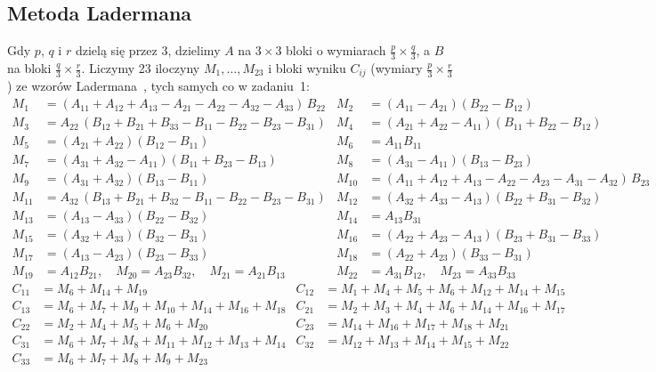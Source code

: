 \subsection{Metoda Ladermana}
Gdy $p$, $q$ i $r$ dzielą się przez 3, dzielimy $A$ na $3\times3$ bloki o wymiarach $\frac p3\times\frac q3$, a $B$ na
bloki $\frac q3\times\frac r3$. Liczymy 23 iloczyny $M_1,\dots,M_{23}$ i bloki wyniku $C_{ij}$ (wymiary
$\frac p3\times\frac r3$) ze wzorów Ladermana~\cite{laderman}, tych samych co w zadaniu~1:
{\small
\begin{equation}\label{eq:laderman-m}
\begin{aligned}
M_{1}  &= (A_{11}{+}A_{12}{+}A_{13}{-}A_{21}{-}A_{22}{-}A_{32}{-}A_{33})\,B_{22} &
M_{2}  &= (A_{11}{-}A_{21})(B_{22}{-}B_{12}) \\
M_{3}  &= A_{22}\,(B_{12}{+}B_{21}{+}B_{33}{-}B_{11}{-}B_{22}{-}B_{23}{-}B_{31}) &
M_{4}  &= (A_{21}{+}A_{22}{-}A_{11})(B_{11}{+}B_{22}{-}B_{12}) \\
M_{5}  &= (A_{21}{+}A_{22})(B_{12}{-}B_{11}) &
M_{6}  &= A_{11}B_{11} \\
M_{7}  &= (A_{31}{+}A_{32}{-}A_{11})(B_{11}{+}B_{23}{-}B_{13}) &
M_{8}  &= (A_{31}{-}A_{11})(B_{13}{-}B_{23}) \\
M_{9}  &= (A_{31}{+}A_{32})(B_{13}{-}B_{11}) &
M_{10} &= (A_{11}{+}A_{12}{+}A_{13}{-}A_{22}{-}A_{23}{-}A_{31}{-}A_{32})\,B_{23} \\
M_{11} &= A_{32}\,(B_{13}{+}B_{21}{+}B_{32}{-}B_{11}{-}B_{22}{-}B_{23}{-}B_{31}) &
M_{12} &= (A_{32}{+}A_{33}{-}A_{13})(B_{22}{+}B_{31}{-}B_{32}) \\
M_{13} &= (A_{13}{-}A_{33})(B_{22}{-}B_{32}) &
M_{14} &= A_{13}B_{31} \\
M_{15} &= (A_{32}{+}A_{33})(B_{32}{-}B_{31}) &
M_{16} &= (A_{22}{+}A_{23}{-}A_{13})(B_{23}{+}B_{31}{-}B_{33}) \\
M_{17} &= (A_{13}{-}A_{23})(B_{23}{-}B_{33}) &
M_{18} &= (A_{22}{+}A_{23})(B_{33}{-}B_{31}) \\
M_{19} &= A_{12}B_{21},\quad M_{20} = A_{23}B_{32},\quad M_{21} = A_{21}B_{13} &
M_{22} &= A_{31}B_{12},\quad M_{23} = A_{33}B_{33}
\end{aligned}
\end{equation}
\begin{equation}\label{eq:laderman-c}
\begin{aligned}
C_{11} &= M_6{+}M_{14}{+}M_{19} &
C_{12} &= M_1{+}M_4{+}M_5{+}M_6{+}M_{12}{+}M_{14}{+}M_{15} \\
C_{13} &= M_6{+}M_7{+}M_9{+}M_{10}{+}M_{14}{+}M_{16}{+}M_{18} &
C_{21} &= M_2{+}M_3{+}M_4{+}M_6{+}M_{14}{+}M_{16}{+}M_{17} \\
C_{22} &= M_2{+}M_4{+}M_5{+}M_6{+}M_{20} &
C_{23} &= M_{14}{+}M_{16}{+}M_{17}{+}M_{18}{+}M_{21} \\
C_{31} &= M_6{+}M_7{+}M_8{+}M_{11}{+}M_{12}{+}M_{13}{+}M_{14} &
C_{32} &= M_{12}{+}M_{13}{+}M_{14}{+}M_{15}{+}M_{22} \\
C_{33} &= M_6{+}M_7{+}M_8{+}M_9{+}M_{23}
\end{aligned}
\end{equation}
}%
